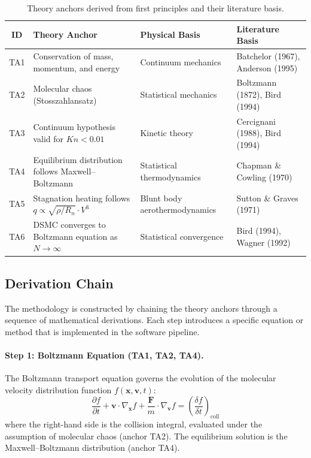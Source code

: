 \begin{table}[H]
\centering
\caption{Theory anchors derived from first principles and their literature basis.}
\label{tab:theory_anchors}
\begin{tabularx}{\textwidth}{@{}c >{\RaggedRight\arraybackslash}X >{\RaggedRight\arraybackslash}p{} >{\RaggedRight\arraybackslash}p{}@{}}
\toprule
\textbf{ID} & \textbf{Theory Anchor} & \textbf{Physical Basis} & \textbf{Literature Basis} \\ \midrule
TA1 & Conservation of mass, momentum, and energy & Continuum mechanics & Batchelor (1967), Anderson (1995) \\
TA2 & Molecular chaos (Stosszahlansatz) & Statistical mechanics & Boltzmann (1872), Bird (1994) \\
TA3 & Continuum hypothesis valid for $Kn < 0.01$ & Kinetic theory & Cercignani (1988), Bird (1994) \\
TA4 & Equilibrium distribution follows Maxwell--Boltzmann & Statistical thermodynamics & Chapman \& Cowling (1970) \\
TA5 & Stagnation heating follows $q \propto \sqrt{\rho/R_n} \cdot V^3$ & Blunt body aerothermodynamics & Sutton \& Graves (1971) \\
TA6 & DSMC converges to Boltzmann equation as $N \to \infty$ & Statistical convergence & Bird (1994), Wagner (1992) \\
\bottomrule
\end{tabularx}
\end{table}

\subsection{Derivation Chain}
The methodology is constructed by chaining the theory anchors through a sequence of mathematical derivations. Each step introduces a specific equation or method that is implemented in the software pipeline.

\paragraph{Step 1: Boltzmann Equation (TA1, TA2, TA4).}
The Boltzmann transport equation governs the evolution of the molecular velocity distribution function $f(\mathbf{x}, \mathbf{v}, t)$:
\begin{equation}
\frac{\partial f}{\partial t} + \mathbf{v} \cdot \nabla_{\mathbf{x}} f + \frac{\mathbf{F}}{m} \cdot \nabla_{\mathbf{v}} f = \left(\frac{\delta f}{\delta t}\right)_{\text{coll}}
\label{eq:boltzmann_dsmc}
\end{equation}
where the right-hand side is the collision integral, evaluated under the assumption of molecular chaos (anchor TA2). The equilibrium solution is the Maxwell--Boltzmann distribution (anchor TA4).

